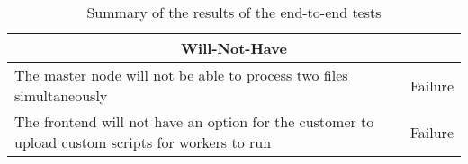 \begin{table}
\begin{tabular}{|p{10cm}|c|}
        \multicolumn{2}{|c|}{\textbf{Will-Not-Have}} \\ \hline
        The master node will not be able to process two files simultaneously & Failure \\ \hline
        The frontend will not have an option for the customer to upload custom scripts for workers to run & Failure \\ \hline
    \end{tabular}
    \caption{Summary of the results of the end-to-end tests}
\end{table}